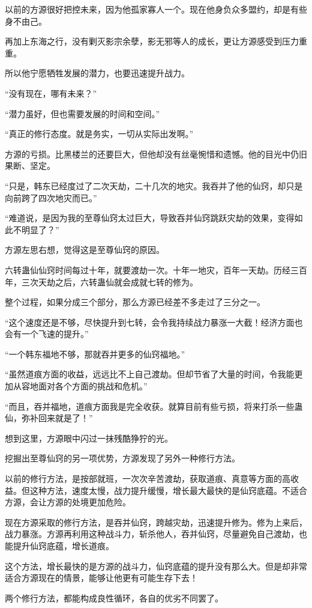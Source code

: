\begin{this_body}
以前的方源很好把控未来，因为他孤家寡人一个。现在他身负众多盟约，却是有些身不由己。

再加上东海之行，没有剿灭影宗余孽，影无邪等人的成长，更让方源感受到压力重重。

所以他宁愿牺牲发展的潜力，也要迅速提升战力。

“没有现在，哪有未来？”

“潜力虽好，但也需要发展的时间和空间。”

“真正的修行态度。就是务实，一切从实际出发啊。”

方源的亏损。比黑楼兰的还要巨大，但他却没有丝毫惋惜和遗憾。他的目光中仍旧果断、坚定。

“只是，韩东已经度过了二次天劫，二十几次的地灾。我吞并了他的仙窍，却只是向前跨了四次地灾而已。”

“难道说，是因为我的至尊仙窍太过巨大，导致吞并仙窍跳跃灾劫的效果，变得如此不明显了？”

方源左思右想，觉得这是至尊仙窍的原因。

六转蛊仙仙窍时间每过十年，就要渡劫一次。十年一地灾，百年一天劫。历经三百年，三次天劫之后，六转蛊仙就会成就七转的修为。

整个过程，如果分成三个部分，那么方源已经差不多走过了三分之一。

“这个速度还是不够，尽快提升到七转，会令我持续战力暴涨一大截！经济方面也会有一个飞速的提升。”

“一个韩东福地不够，那就吞并更多的仙窍福地。”

“虽然道痕方面的收益，远远比不上自己渡劫。但却节省了大量的时间，令我能更加从容地面对各个方面的挑战和危机。”

“而且，吞并福地，道痕方面我是完全收获。就算目前有些亏损，将来打杀一些蛊仙，弥补回来就是了！”

想到这里，方源眼中闪过一抹残酷狰狞的光。

挖掘出至尊仙窍的另一项优势，方源发现了另外一种修行方法。

以前的修行方法，是按部就班，一次次辛苦渡劫，获取道痕、真意等方面的高收益。但这种方法，速度太慢，战力提升缓慢，增长最大最快的是仙窍底蕴。不适合方源，会让方源的处境更加危险。

现在方源采取的修行方法，是吞并仙窍，跨越灾劫，迅速提升修为。修为上来后，战力暴涨。方源再利用这种战斗力，斩杀他人，吞并仙窍，尽量避免自己渡劫，也能提升仙窍底蕴，增长道痕。

这个方法，增长最快的是方源的战斗力，仙窍底蕴的提升没有那么大。但是却非常适合方源现在的情景，能够让他更有可能生存下去！

两个修行方法，都能构成良性循环，各自的优劣不同罢了。

\end{this_body}

